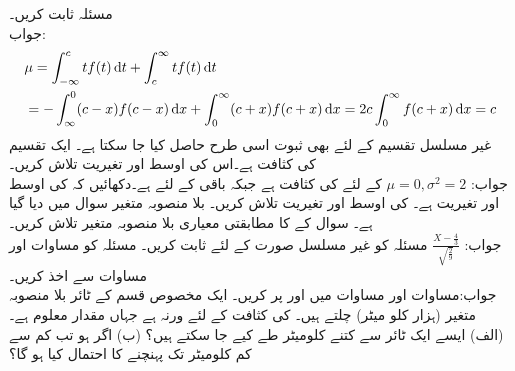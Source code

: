 
\quad
مسئلہ  ثابت کریں۔\\
جواب:\quad
\begin{align*}
&\mu=\int_{-\infty}^{c} tf(t)\dif t+\int_{c}^{\infty}tf(t)\dif t\\
&=-\int_{\infty}^{0}(c-x)f(c-x)\dif x+\int_{0}^{\infty}(c+x)f(c+x)\dif x=2c\int_{0}^{\infty}f(c+x)\dif x=c
\end{align*}
غیر مسلسل تقسیم کے لئے بھی ثبوت اسی طرح حاصل کیا جا سکتا ہے۔
\quad
ایک تقسیم کی کثافت   ہے۔اس  کی اوسط اور تغیریت تلاش کریں۔\\
جواب:\quad
$\mu=0,\sigma^2=2$
\quad
{} کے لئے  کی کثافت  ہے جبکہ باقی  کے لئے  ہے۔دکھائیں کہ  کی اوسط  اور تغیریت  ہے۔
\quad
{} کی اوسط اور تغیریت تلاش کریں۔ بلا منصوبہ متغیر  سوال  میں دیا گیا ہے۔
\quad
سوال  کے  کا مطابقتی معیاری بلا منصوبہ متغیر  تلاش کریں۔\\
جواب:\quad
$\tfrac{X-\tfrac{4}{3}}{\sqrt{\tfrac{2}{9}}}$
\quad
مسئلہ  کو غیر مسلسل صورت کے لئے ثابت کریں۔
\quad
مسئلہ  کو مساوات  اور مساوات  سے اخذ کریں۔\\
جواب:\quad مساوات  اور مساوات  میں  اور  پر کریں۔
\quad
ایک مخصوص قسم کے ٹائر بلا منصوبہ متغیر  (ہزار کلو میٹر) چلتے ہیں۔ کی کثافت  کے لئے  ورنہ  ہے جہاں  مقدار معلوم ہے۔ (الف) ایسے ایک ٹائر سے کتنے کلومیٹر طے کیے جا سکتے ہیں؟ (ب) اگر  ہو تب کم سے کم  کلومیٹر تک پہنچنے کا احتمال کیا ہو گا؟
\quad
